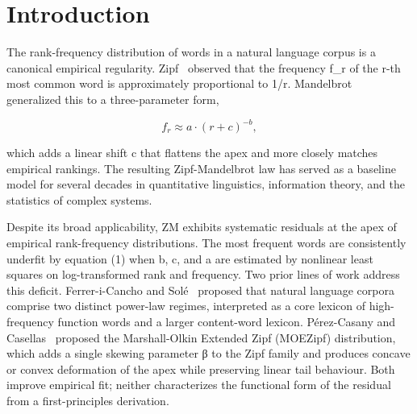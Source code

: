 \documentclass[11pt]{article}
\begin{document}
\begin{abstract}
$x^x-\sqrt{x}$ in a manner consistent with the same low-c manifold. We position the Bregman residual as a diagnostic biomarker for single-regime misspecification, the decoupled erf two-regime model as the current canonical rank-curve mechanism, and the Seam-Mandelbrot PMF as a mechanism-capturing discrete alternative to parsimonious phenomenological skew extensions.

\end{abstract}
\section{Introduction}\label{sec:intro}

The rank-frequency distribution of words in a natural language corpus is a canonical empirical regularity. Zipf~\cite{zipf1949} observed that the frequency f\_r of the r-th most common word is approximately proportional to 1/r. Mandelbrot~\cite{mandelbrot1953} generalized this to a three-parameter form,

\begin{equation}
\tag{1}\label{eq:zm}
f_r \approx a \cdot (r + c)^{-b},
\end{equation}

which adds a linear shift c that flattens the apex and more closely matches empirical rankings. The resulting Zipf-Mandelbrot law has served as a baseline model for several decades in quantitative linguistics, information theory, and the statistics of complex systems.

Despite its broad applicability, ZM exhibits systematic residuals at the apex of empirical rank-frequency distributions. The most frequent words are consistently underfit by equation (1) when b, c, and a are estimated by nonlinear least squares on log-transformed rank and frequency. Two prior lines of work address this deficit. Ferrer-i-Cancho and Solé~\cite{ferrer2001} proposed that natural language corpora comprise two distinct power-law regimes, interpreted as a core lexicon of high-frequency function words and a larger content-word lexicon. Pérez-Casany and Casellas~\cite{perez2013} proposed the Marshall-Olkin Extended Zipf (MOEZipf) distribution, which adds a single skewing parameter β to the Zipf family and produces concave or convex deformation of the apex while preserving linear tail behaviour. Both improve empirical fit; neither characterizes the functional form of the residual from a first-principles derivation.
\end{document}
